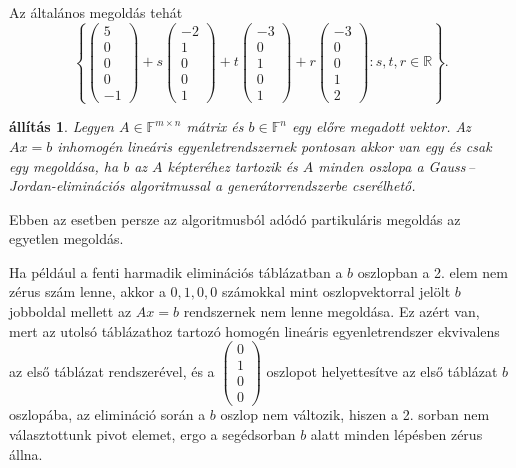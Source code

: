 \documentclass[9pt, a4paper, showtrims]{memoir}
\theoremstyle{plain}
\newtheorem{proposition}{állítás}[chapter]
\theoremstyle{remark}
\theoremstyle{definition}
\begin{document}
Az általános megoldás tehát
\[
	\left\{
	\begin{pmatrix}
		5 \\0\\0\\0\\-1
	\end{pmatrix}
	+s
	\begin{pmatrix}
		-2 \\1\\0\\0\\1
	\end{pmatrix}
	+t
	\begin{pmatrix}
		-3 \\0\\1\\0\\1
	\end{pmatrix}
	+r
	\begin{pmatrix}
		-3 \\0\\0\\1\\2
	\end{pmatrix}
	:s,t,r\in\mathbb{R}
	\right\}.
\]
\begin{proposition}
    Legyen $A\in\mathbb{F}^{m\times n}$ mátrix és $b\in\mathbb{F}^n$ egy előre megadott vektor.
	Az $Ax=b$ inhomogén lineáris egyenletrendszernek pontosan akkor van egy és csak egy
	megoldása, ha $b$ az $A$ képteréhez tartozik 
    és $A$ minden oszlopa a Gauss\,--\,Jordan-eliminációs algoritmussal
    a generátorrendszerbe cserélhető.
\end{proposition}
Ebben az esetben persze az algoritmusból adódó partikuláris megoldás az egyetlen megoldás.

Ha például a fenti harmadik eliminációs táblázatban a $b$ oszlopban a 2. elem nem zérus szám lenne,
akkor a $0,1,0,0$ számokkal mint oszlopvektorral jelölt $b$ jobboldal mellett az $Ax=b$ rendszernek nem lenne megoldása. 
Ez azért van, mert az utolsó táblázathoz tartozó homogén lineáris egyenletrendszer ekvivalens az első táblázat rendszerével, és a 
\(
\begin{pmatrix}0\\1\\0\\0\end{pmatrix}
\)
oszlopot helyettesítve az első táblázat $b$ oszlopába, az elimináció során a $b$ oszlop nem változik, hiszen a 2. sorban nem választottunk pivot elemet, ergo a segédsorban $b$ alatt minden lépésben zérus állna.
\end{document}
